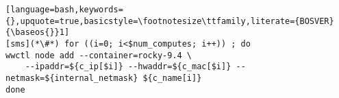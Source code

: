 \begin{lstlisting}[language=bash,keywords={},upquote=true,basicstyle=\footnotesize\ttfamily,literate={BOSVER}{\baseos{}}1]
[sms](*\#*) for ((i=0; i<$num_computes; i++)) ; do
wwctl node add --container=rocky-9.4 \
    --ipaddr=${c_ip[$i]} --hwaddr=${c_mac[$i]} --netmask=${internal_netmask} ${c_name[i]}
done
\end{lstlisting}
